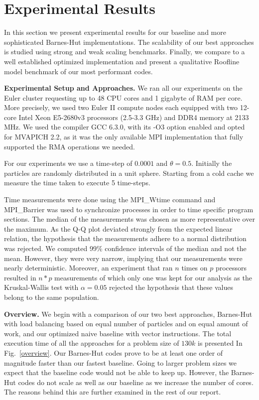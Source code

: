 \documentclass[letterpaper]{article}
\newcommand{\mypar}[1]{{\bf #1.}}
\begin{document}
\section{Experimental Results}\label{sec:exp}
In this section we present experimental results for our baseline and more sophisticated Barnes-Hut implementations. The scalability of our best approaches is studied using strong and weak scaling benchmarks.
Finally, we compare to a well established optimized implementation and present a qualitative Roofline model benchmark of our most performant codes.

\mypar{Experimental Setup and Approaches} We ran all our experiments on the Euler cluster \cite{cluster} requesting up to 48 CPU cores and 1 gigabyte of RAM per core. More precisely, we used two Euler II compute nodes each equipped with two 12-core Intel Xeon E5-2680v3 processors (2.5-3.3 GHz) and DDR4 memory at 2133 MHz. We used the compiler GCC 6.3.0, with its -O3 option enabled and opted for MVAPICH 2.2, as it was the only available MPI implementation that fully supported the RMA operations we needed. 

For our experiments we use a time-step of $0.0001$ and $\theta = 0.5$. Initially the particles are randomly distributed in a unit sphere. Starting from a cold cache we measure the time taken to execute 5 time-steps.

Time measurements were done using the MPI\_Wtime command and MPI\_Barrier was used to synchronize processes in order to time specific program sections. The median of the measurements was chosen as more representative over the maximum. As the Q-Q plot deviated strongly from the expected linear relation, the hypothesis that the measurements adhere to a normal distribution was rejected. We computed 99\% confidence intervals of the median and not the mean. However, they were very narrow, implying that our measurements were nearly deterministic. Moreover, an experiment that ran $n$ times on $p$ processors resulted in $n*p$ measurements of which only one was kept for our analysis as the Kruskal-Wallis test with $\alpha=0.05$ rejected the hypothesis that these values belong to the same population.

\mypar{Overview} We begin with a comparison of our two best approaches, Barnes-Hut with load balancing based on equal number of particles and on equal amount of work, and our optimized naive baseline with vector instructions. The total execution time of all the approaches for a problem size of $130k$ is presented In Fig.~\ref{overview}. Our Barnes-Hut codes prove to be at least one order of magnitude faster than our fastest baseline. Going to larger problem sizes we expect that the baseline code would not be able to keep up. However, the Barnes-Hut codes do not scale as well as our baseline as we increase the number of cores. The reasons behind this are further examined in the rest of our report.
\end{document}
